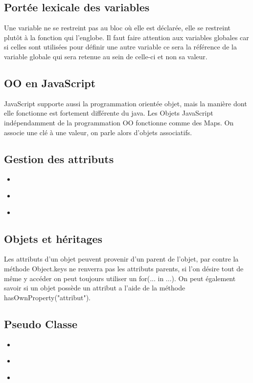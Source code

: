 \documentclass{article}[12pt]
\newcommand{\JavaScript}[2]{
	\begin{itemize}
		\item[]
	\end{itemize}
}
\begin{document}
\subsection{Portée lexicale des variables}

Une variable ne se restreint pas au bloc où elle est déclarée, elle se restreint plutôt à la fonction qui  l'englobe.
\newline
\newline
Il faut faire attention aux variables globales car si celles sont utilisées pour définir une autre variable ce sera la référence de la variable globale qui sera retenue au sein de celle-ci et non sa valeur.

\subsection{OO en JavaScript}

JavaScript supporte aussi la programmation orientée objet, mais la manière dont elle fonctionne est fortement différente du java.
\newline
\newline
Les Objets JavaScript indépendamment de la programmation OO fonctionne comme des Maps. On associe une clé à une valeur, on parle alors d'objets associatifs.

\subsection{Gestion des attributs}

\JavaScript{attribute_value}{Valeur d'un attribut}
\JavaScript{change_value}{Modification d'un attribut}
\JavaScript{delete_value}{Suppresion d'un attribut}

\subsection{Objets et héritages}

Les attributs d'un objet peuvent provenir d'un parent de l'objet, par contre la méthode Object.keys ne renverra pas les attributs parents, si l'on désire tout de même y accéder on peut toujours utiliser un for(... in ...). On peut également savoir si un objet possède un attribut a l'aide de la méthode hasOwnProperty("attribut").

\subsection{Pseudo Classe}

\JavaScript{decla_pseudo_classe}{Exemple de déclaration d'une pseudo classe}

\JavaScript{util_pseudo_classe}{Exemple d'utilisation d'une pseudo classe}

\JavaScript{heritage}{Exemple d'utilisation de l'héritage sur une pseudo classe}
\end{document}
